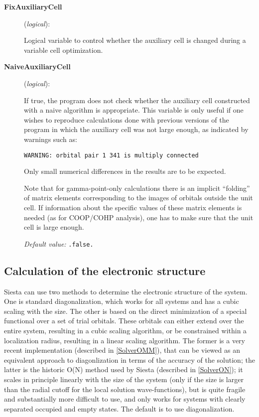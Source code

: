\documentclass[11pt]{article}
\begin{document}
\begin{description}

\item[{\bf FixAuxiliaryCell}] ({\it logical}):

Logical variable to control whether the auxiliary cell is changed
during a variable cell optimization.

\item[{\bf NaiveAuxiliaryCell}] ({\it logical}):

If true, the program does not check whether the auxiliary cell
constructed with a naive algorithm is appropriate. This variable is
only useful if one wishes to reproduce calculations done with previous
versions of the program in which the auxiliary cell was not large
enough, as indicated by warnings such as:

\texttt{WARNING: orbital pair 1 341 is multiply connected}

Only small numerical differences in the results are to be expected.

Note that for gamma-point-only calculations there is an implicit
``folding'' of matrix elements corresponding to the images of orbitals
outside the unit cell. If information about the specific values of
these matrix elements is needed (as for COOP/COHP analysis), one has
to make sure that the unit cell is large enough.  

{\it Default value:} {\tt .false.}

\end{description}


\subsection{Calculation of the electronic structure}

{\sc Siesta} can use two methods to determine the electronic structure
of the system. One is standard diagonalization, which works for all
systems and has a cubic scaling with the size. The other is based on
the direct minimization of a special functional over a set of
trial orbitals. These orbitals can either extend over the entire system,
resulting in a cubic scaling algorithm, or be constrained within a
localization radius, resulting in a linear scaling algorithm. The former
is a very recent implementation (described in \ref{SolverOMM}), that can
be viewed as an equivalent approach to diagonlization in terms of the
accuracy of the solution; the latter is the historic O(N) method used by
{\sc Siesta} (described in \ref{SolverON}); it scales in principle
linearly with the size of the system (only if the size is larger than
the radial cutoff for the local solution wave-functions), but is quite
fragile and substantially more difficult to use, and only works for
systems with clearly separated occupied and empty states. The default is
to use diagonalization.
\end{document}
